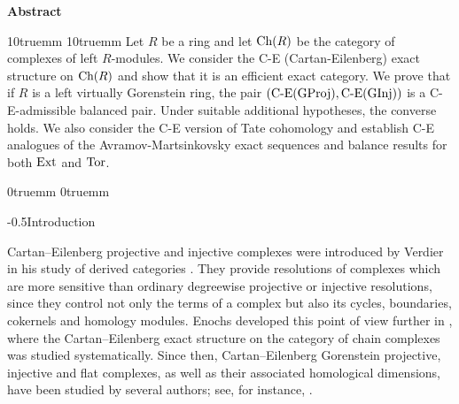 \documentclass[reqno,12pt]{amsart}
\makeatletter
\numberwithin{equation}{section}
\def\Ext{\mbox{\rm Ext}} \def\Tor{\mbox{\rm Tor}}\def\Hom{\mbox{\rm Hom}} \def\dim{\mbox{\rm dim}} \def\Iso{\mbox{\rm Iso}}
\def\dim{\mbox{\rm dim}}\def\Irr{\mbox{\rm Irr}}\def\rad{\mbox{\rm rad}}\def\fg{\mbox{\rm fg}}
\def\Ch{\mbox{\rm Ch}}
\theoremstyle{plain}
\theoremstyle{definition}
\renewcommand{\section}{\@startsection{section}{1}{0mm}
  {-\baselineskip}{0.5\baselineskip}{\bf\leftline}}
\makeatother
\begin{document}

\centerline {\bf  Abstract}
\bigskip
\leftskip10truemm \rightskip10truemm
Let $R$ be a ring and let $\Ch(R)$ be the category of complexes of left $R$-modules. We consider the C-E (Cartan-Eilenberg)
exact structure on $\Ch(R)$ and show that it is an efficient exact category. We prove that if $R$ is a
left virtually Gorenstein ring, the pair $(\text{C-E}({\rm GProj}),\text{C-E}({\rm GInj}))$ is a C-E-admissible
balanced pair. Under suitable additional hypotheses, the converse holds. We also consider the C-E version of Tate cohomology
and establish C-E analogues of the Avramov-Martsinkovsky exact sequences and balance results for both $\Ext$ and $\Tor$.










\leftskip0truemm \rightskip0truemm



\section{Introduction}



Cartan--Eilenberg projective and injective complexes were introduced by
Verdier in his study of derived categories \cite{V96}. They provide
resolutions of complexes which are more sensitive than ordinary degreewise
projective or injective resolutions, since they control not only the terms of a
complex but also its cycles, boundaries, cokernels and homology modules. Enochs
developed this point of view further in \cite{E11}, where the
Cartan--Eilenberg exact structure on the category of chain complexes was studied
systematically. Since then, Cartan--Eilenberg Gorenstein projective, injective
and flat complexes, as well as their associated homological dimensions, have
been studied by several authors; see, for instance,
\cite{EFHO26, YL14-1, YL14}.
\end{document}
